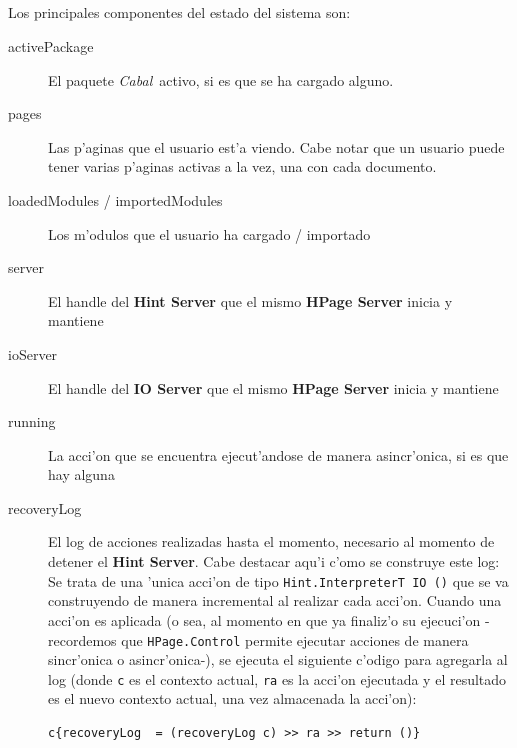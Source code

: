 \documentclass[a4paper]{article}
\newcommand{\cabal}{\textsl{Cabal}}
\begin{document}
\subparagraph{} Los principales componentes del estado del sistema son:
\begin{description}
	\item[activePackage] El paquete \cabal\ activo, si es que se ha cargado alguno.
	\item[pages] Las p'aginas que el usuario est'a viendo.  Cabe notar que un usuario puede tener varias p'aginas activas a la vez, una con cada documento.
	\item[loadedModules / importedModules] Los m'odulos que el usuario ha cargado / importado
	\item[server] El handle del \textbf{Hint Server} que el mismo \textbf{HPage Server} inicia y mantiene
	\item[ioServer] El handle del \textbf{IO Server} que el mismo \textbf{HPage Server} inicia y mantiene
	\item[running] La acci'on que se encuentra ejecut'andose de manera asincr'onica, si es que hay alguna
	\item[recoveryLog] El log de acciones realizadas hasta el momento, necesario al momento de detener el \textbf{Hint Server}.  Cabe destacar aqu'i c'omo se construye este log: Se trata de una 'unica acci'on de tipo \texttt{Hint.InterpreterT IO ()} que se va construyendo de manera incremental al realizar cada acci'on.  Cuando una acci'on es aplicada (o sea, al momento en que ya finaliz'o su ejecuci'on -recordemos que \texttt{HPage.Control} permite ejecutar acciones de manera sincr'onica o asincr'onica-), se ejecuta el siguiente c'odigo para agregarla al log (donde \texttt{c} es el contexto actual, \texttt{ra} es la acci'on ejecutada y el resultado es el nuevo contexto actual, una vez almacenada la acci'on):
\begin{center}\begin{lstlisting}
c{recoveryLog  = (recoveryLog c) >> ra >> return ()}
\end{lstlisting}\end{center}
\end{description}
\end{document}
